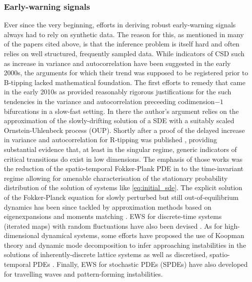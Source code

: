 \documentclass[dvipsnames, table, 11pt]{article}
\begin{document}
\subsubsection{Early-warning signals}
Ever since the very beginning, efforts in deriving robust early-warning signals always had to rely on synthetic data.
The reason for this, as mentioned in many of the papers cited above, is that the inference problem is itself hard and often relies on well structured, frequently sampled data.
While indicators of CSD such as increase in variance and autocorrelation have been suggested in the early 2000s, the arguments for which their trend was supposed to be registered prior to B-tipping lacked mathematical foundation.
The first efforts to remedy that came in the early 2010s as \cite{Kuehn2011,Kuehn2013} provided reasonably rigorous justifications for the such tendencies in the variance and autocorrelation preceeding codimension$-1$ bifurcations in a slow-fast setting.
In there the author's argument relies on the approximation of the slowly-drifting solution of a SDE with a suitably scaled Ornstein-Uhlenbeck process (OUP).
Shortly after a proof of the delayed increase in variance and autocorrelation for R-tipping was published \cite{Ritchie2016}, providing substantial evidence that, at least in the singular regime, generic indicators of critical transitions do exist in low dimensions.
The emphasis of those works was the reduction of the spatio-temporal Fokker-Plank PDE in to the time-invariant regime allowing for amenable characterisation of the stationary probability distribution of the solution of systems like \ref{eq:initial_sde}.
The explicit solution of the Fokker-Planck equation for slowly perturbed but still out-of-equilibrium dynamics has been since tackled by approximation methods based on eigenexpansions \cite{Shizgal2016, Ritchie2017} and moments matching \cite{Donovan2024}.
EWS for discrete-time systems (iterated maps) with random fluctuations have also been devised \cite{Kuehn2018}.
As for high-dimensional dynamical systems, some efforts have proposed the use of Koopman theory and dynamic mode decomposition to infer approaching instabilities in the solutions of inherently-discrete lattice systems \cite{Donovan2022} as well as discretised, spatio-temporal PDEs \cite{Gottwald2020}.
Finally, EWS for stochastic PDEs (SPDEs) have also developed for travelling waves \cite{Kuehn2013b} and pattern-forming \cite{Gowda2015} instabilities.



%
%
%
%
%
\end{document}
